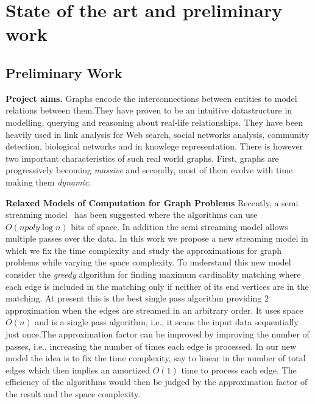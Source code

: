 
\section{State of the art and preliminary work}

\subsection*{Preliminary Work}


\textbf{Project aims.} Graphs encode the interconnections between entities to model relations between them.They have proven to be an intuitive datastructure in modelling, querying and reasoning about real-life relationships. They have been heavily used in link analysis for Web search, social networks analysis, community detection, biological networks and in knowlege representation. There is however two important characteristics of such real world graphs. First, graphs are progressively becoming \emph{massive} and secondly, most of them evolve with time making them \emph{dynamic}. ~\cite{Henzinger,Feigenbaum}


\textbf{Relaxed Models of Computation for Graph Problems} Recently, a semi streaming model~\cite{Muthukrishnan03} has been suggested where the algorithms can use $O(n poly \log n)$ bits of space. In addition the semi streaming model allows multiple passes over the data.  In this work we propose a new streaming model in which we fix the time complexity and study the approximations for graph problems while varying the space complexity. To understand this new model consider the \emph{greedy} algorithm for finding maximum cardinality matching where each edge is included in the matching only if neither of its end vertices are in the matching. At present this is the best single pass algorithm providing $2$ approximation when the edges are streamed in an arbitrary order. It uses space $O(n)$ and is a single pass algorithm, i.e., it scans the input data sequentially just once.The approximation factor can be improved by improving the number of passes, i.e., increasing the number of times each edge is processed. In our new model the idea is to fix the time complexity, say to linear in the number of total edges which then implies an amortized $O(1)$ time to process each edge. The efficiency of the algorithms would then be judged by the approximation factor of the result and the space complexity.  

